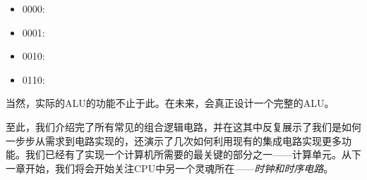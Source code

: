 \documentclass[UTF8]{ctexart}
\begin{document}
\begin{itemize}
\item 0000: 
\item 0001: 
\item 0010: 
\item 0110: 
\end{itemize}

当然，实际的ALU的功能不止于此。在未来，会真正设计一个完整的ALU。

至此，我们介绍完了所有常见的组合逻辑电路，并在这其中反复展示了我们是如何一步步从需求到电路实现的，还演示了几次如何利用现有的集成电路实现更多功能。我们已经有了实现一个计算机所需要的最关键的部分之一——计算单元。从下一章开始，我们将会开始关注CPU中另一个灵魂所在——\textit{时钟和时序电路}。
\end{document}

